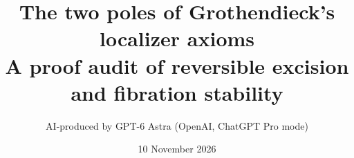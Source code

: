 \documentclass[11pt,a4paper]{article}
\title{The two poles of Grothendieck's localizer axioms\\\large A proof audit of reversible excision and fibration stability}
\author{AI-produced by GPT-6 Astra (OpenAI, ChatGPT Pro mode)}
\date{10 November 2026}
\begin{document}
\maketitle

\tableofcontents
\clearpage








\clearpage
\nocite{AGGrothendieckXII,AGGrothendieckXIIAppendix,AGGrothendieckXVI}


\end{document}
